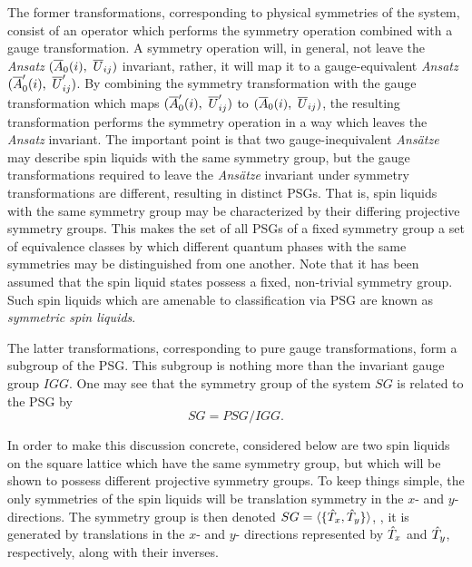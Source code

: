 The former transformations, corresponding to physical symmetries of the system, consist of an operator which performs the symmetry operation combined with a gauge transformation.
A symmetry operation will, in general, not leave the \textit{Ansatz} $(\overline{A}_0(i),~\overline{U}_{ij})$ invariant, rather, it will map it to a gauge-equivalent \textit{Ansatz} $(\overline{A}'_0(i),~\overline{U}'_{ij})$.
By combining the symmetry transformation with the gauge transformation which maps $(\overline{A}'_0(i),~\overline{U}'_{ij})$ to $(\overline{A}_0(i),~\overline{U}_{ij})$, the resulting transformation performs the symmetry operation in a way which leaves the \textit{Ansatz} invariant.
The important point is that two gauge-inequivalent \textit{Ans\"atze} may describe spin liquids with the same symmetry group, but the gauge transformations required to leave the \textit{Ans\"atze} invariant under symmetry transformations are different, resulting in distinct PSGs.
That is, spin liquids with the same symmetry group may be characterized by their differing projective symmetry groups.
This makes the set of all PSGs of a fixed symmetry group a set of equivalence classes by which different quantum phases with the same symmetries may be distinguished from one another.
Note that it has been assumed that the spin liquid states possess a fixed, non-trivial symmetry group.
Such spin liquids which are amenable to classification via PSG are known as \textit{symmetric spin liquids}.

The latter transformations, corresponding to pure gauge transformations, form a subgroup of the PSG.
This subgroup is nothing more than the invariant gauge group $IGG$.
One may see that the symmetry group of the system $SG$ is related to the PSG by
%
\begin{equation}
	SG = PSG/IGG.
\end{equation}
%

In order to make this discussion concrete, considered below are two spin liquids on the square lattice which have the same symmetry group, but which will be shown to possess different projective symmetry groups.
To keep things simple, the only symmetries of the spin liquids will be translation symmetry in the $x$- and $y$-directions.
The symmetry group is then denoted $SG = \langle \{ \hat{T}_x, \hat{T}_y \} \rangle$, \ie, it is generated by translations in the $x$- and $y$- directions represented by $\hat{T}_x$ and $\hat{T}_y$, respectively, along with their inverses.

